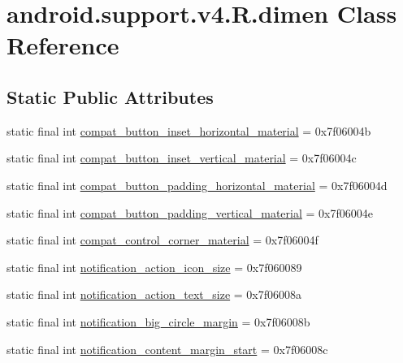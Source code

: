 \hypertarget{classandroid_1_1support_1_1v4_1_1_r_1_1dimen}{}\section{android.\+support.\+v4.\+R.\+dimen Class Reference}
\label{classandroid_1_1support_1_1v4_1_1_r_1_1dimen}
\subsection*{Static Public Attributes}
\begin{DoxyCompactItemize}
\item 
static final int \mbox{\hyperlink{classandroid_1_1support_1_1v4_1_1_r_1_1dimen_a749391e761d0b1564eb37a58de4a1128}{compat\+\_\+button\+\_\+inset\+\_\+horizontal\+\_\+material}} = 0x7f06004b
\item 
static final int \mbox{\hyperlink{classandroid_1_1support_1_1v4_1_1_r_1_1dimen_ab5f86549d65734fbdbc02b8f1c81db39}{compat\+\_\+button\+\_\+inset\+\_\+vertical\+\_\+material}} = 0x7f06004c
\item 
static final int \mbox{\hyperlink{classandroid_1_1support_1_1v4_1_1_r_1_1dimen_a7f2032620e486738d418b0285c20b0ba}{compat\+\_\+button\+\_\+padding\+\_\+horizontal\+\_\+material}} = 0x7f06004d
\item 
static final int \mbox{\hyperlink{classandroid_1_1support_1_1v4_1_1_r_1_1dimen_a1ceba4dabb3ee62a287c026812771b4d}{compat\+\_\+button\+\_\+padding\+\_\+vertical\+\_\+material}} = 0x7f06004e
\item 
static final int \mbox{\hyperlink{classandroid_1_1support_1_1v4_1_1_r_1_1dimen_a5eabb5cd9f1fbb7332bd3e79ff77ff21}{compat\+\_\+control\+\_\+corner\+\_\+material}} = 0x7f06004f
\item 
static final int \mbox{\hyperlink{classandroid_1_1support_1_1v4_1_1_r_1_1dimen_a01ca2c6621abec7453a1df3e82fe49e0}{notification\+\_\+action\+\_\+icon\+\_\+size}} = 0x7f060089
\item 
static final int \mbox{\hyperlink{classandroid_1_1support_1_1v4_1_1_r_1_1dimen_a2437e1695b66799f1b8dbd9bcaaa3358}{notification\+\_\+action\+\_\+text\+\_\+size}} = 0x7f06008a
\item 
static final int \mbox{\hyperlink{classandroid_1_1support_1_1v4_1_1_r_1_1dimen_add847f3ee1febaf2e1d0b768b9331a21}{notification\+\_\+big\+\_\+circle\+\_\+margin}} = 0x7f06008b
\item 
static final int \mbox{\hyperlink{classandroid_1_1support_1_1v4_1_1_r_1_1dimen_a7f76fd4e1d58ff4c219acf0925261870}{notification\+\_\+content\+\_\+margin\+\_\+start}} = 0x7f06008c

\end{DoxyCompactItemize}

